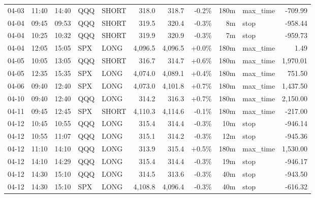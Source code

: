 \documentclass[11pt,a4paper,twoside]{article}
\begin{document}
\begin{center}
\begin{longtable}{>{\color{txtmain}}l l l l l r r r r >{\color{txtmain}}l r}
04-03 & 11:40 & 14:40 & QQQ & SHORT & 318.0 & 318.7 & \textcolor{lossred}{-0.2\%} & 180m & max\_time & \textcolor{lossred}{-709.99} \\
04-04 & 09:45 & 09:53 & QQQ & SHORT & 319.5 & 320.4 & \textcolor{lossred}{-0.3\%} & 8m & stop & \textcolor{lossred}{-958.44} \\
04-04 & 10:25 & 10:32 & QQQ & SHORT & 319.9 & 320.9 & \textcolor{lossred}{-0.3\%} & 7m & stop & \textcolor{lossred}{-959.73} \\
04-04 & 12:05 & 15:05 & SPX & LONG & 4,096.5 & 4,096.5 & \textcolor{wingreen}{+0.0\%} & 180m & max\_time & \textcolor{wingreen}{1.49} \\
04-05 & 10:05 & 13:05 & QQQ & SHORT & 316.7 & 314.7 & \textcolor{wingreen}{+0.6\%} & 180m & max\_time & \textcolor{wingreen}{1,970.01} \\
04-05 & 12:35 & 15:35 & SPX & LONG & 4,074.0 & 4,089.1 & \textcolor{wingreen}{+0.4\%} & 180m & max\_time & \textcolor{wingreen}{751.50} \\
04-06 & 09:40 & 12:40 & SPX & LONG & 4,073.0 & 4,101.8 & \textcolor{wingreen}{+0.7\%} & 180m & max\_time & \textcolor{wingreen}{1,437.50} \\
04-10 & 09:40 & 12:40 & QQQ & LONG & 314.2 & 316.3 & \textcolor{wingreen}{+0.7\%} & 180m & max\_time & \textcolor{wingreen}{2,150.00} \\
04-11 & 09:45 & 12:45 & SPX & SHORT & 4,110.3 & 4,114.6 & \textcolor{lossred}{-0.1\%} & 180m & max\_time & \textcolor{lossred}{-217.00} \\
04-12 & 10:45 & 10:55 & QQQ & LONG & 315.4 & 314.4 & \textcolor{lossred}{-0.3\%} & 10m & stop & \textcolor{lossred}{-946.14} \\
04-12 & 10:55 & 11:07 & QQQ & LONG & 315.1 & 314.2 & \textcolor{lossred}{-0.3\%} & 12m & stop & \textcolor{lossred}{-945.36} \\
04-12 & 11:10 & 14:10 & QQQ & LONG & 313.9 & 315.4 & \textcolor{wingreen}{+0.5\%} & 180m & max\_time & \textcolor{wingreen}{1,530.00} \\
04-12 & 14:10 & 14:29 & QQQ & LONG & 315.4 & 314.4 & \textcolor{lossred}{-0.3\%} & 19m & stop & \textcolor{lossred}{-946.17} \\
04-12 & 14:30 & 15:10 & QQQ & LONG & 314.5 & 313.6 & \textcolor{lossred}{-0.3\%} & 40m & stop & \textcolor{lossred}{-943.50} \\
04-12 & 14:30 & 15:10 & SPX & LONG & 4,108.8 & 4,096.4 & \textcolor{lossred}{-0.3\%} & 40m & stop & \textcolor{lossred}{-616.32} \\

\end{longtable}
\end{center}
\end{document}
